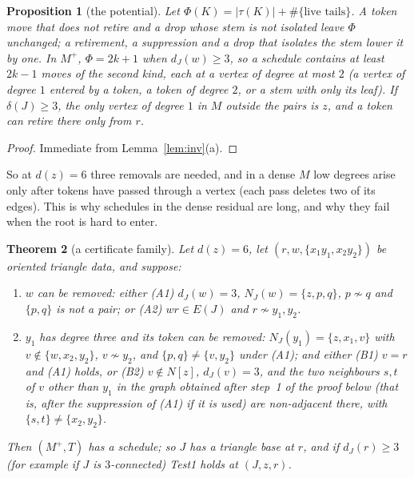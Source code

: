\documentclass[11pt]{amsart}
\newtheorem{theorem}{Theorem}[section]
\newtheorem{proposition}[theorem]{Proposition}
\theoremstyle{definition}
\begin{document}
\begin{proposition}[the potential]\label{prop:potential}
Let $\Phi(K)=|\tau(K)|+\#\{\text{live tails}\}$. A token move that does not retire and a drop whose
stem is not isolated leave $\Phi$ unchanged; a retirement, a suppression and a drop that isolates
the stem lower it by one. In $M^+$, $\Phi=2k+1$ when $d_J(w)\ge3$, so a schedule contains at least $2k-1$ moves of the
second kind, each at a vertex of degree at most $2$ (a vertex of degree $1$ entered by a token, a
token of degree $2$, or a stem with only its leaf). If $\delta(J)\ge3$, the only vertex of degree $1$
in $M$ outside the pairs is $z$, and a token can retire there only from $r$.
\end{proposition}

\begin{proof}
Immediate from Lemma~\ref{lem:inv}(a).
\end{proof}

So at $d(z)=6$ three removals are needed, and in a dense $M$ low degrees arise only after tokens
have passed through a vertex (each pass deletes two of its edges). This is why schedules in the
dense residual are long, and why they fail when the root is hard to enter.

\begin{theorem}[a certificate family]\label{thm:cover}
Let $d(z)=6$, let $(r,w,\{x_1y_1,x_2y_2\})$ be oriented triangle data, and suppose:
\begin{enumerate}[label=(\Alph*)]
\item \emph{$w$ can be removed}: either (A1) $d_J(w)=3$, $N_J(w)=\{z,p,q\}$, $p\not\sim q$ and
$\{p,q\}$ is not a pair; or (A2) $wr\in E(J)$ and $r\not\sim y_1,y_2$.
\item \emph{$y_1$ has degree three and its token can be removed}: $N_J(y_1)=\{z,x_1,v\}$ with
$v\notin\{w,x_2,y_2\}$, $v\not\sim y_2$, and $\{p,q\}\ne\{v,y_2\}$ under (A1); and either (B1)
$v=r$ and (A1) holds, or (B2) $v\notin N[z]$, $d_J(v)=3$, and the two neighbours $s,t$ of $v$
other than $y_1$ in the graph obtained after step~1 of the proof below (that is, after the
suppression of (A1) if it is used) are non-adjacent there, with $\{s,t\}\ne\{x_2,y_2\}$.
\end{enumerate}
Then $(M^+,T)$ has a schedule; so $J$ has a triangle base at $r$, and if $d_J(r)\ge3$ (for example
if $J$ is $3$-connected) Test1 holds at $(J,z,r)$.
\end{theorem}
\end{document}
